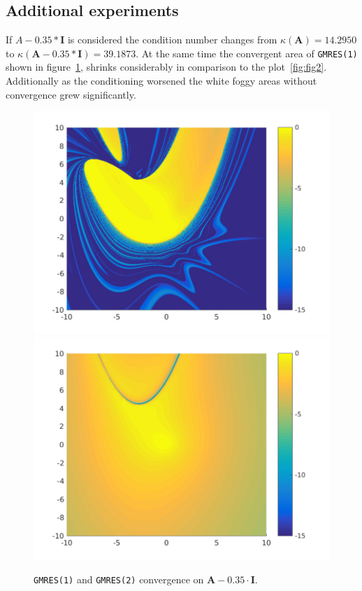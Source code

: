 \subsection{Additional experiments}
If $A - 0.35*\mathbf{I}$ is considered the condition number changes from $\kappa(\mathbf{A}) = 14.2950$ to  $\kappa(\mathbf{A} - 0.35*\mathbf{I}) = 39.1873$. At the same time the convergent area of \texttt{GMRES(1)} shown in figure~\ref{fig:modA}, shrinks considerably in comparison to the plot~\ref{fig:fig2}. Additionally as the conditioning worsened the white foggy areas without convergence grew significantly. 
\begin{figure}
\centering
\includegraphics[width=0.45\linewidth]{../src/figure/Am0p35eyeGMRES1}
\includegraphics[width=0.45\linewidth]{../src/figure/Am0p35eyeGMRES2}
\caption{\texttt{GMRES(1)} and \texttt{GMRES(2)} convergence on $\mathbf{A} - 0.35 \cdot \mathbf{I}$.  } 
\label{fig:modA}
\end{figure}

